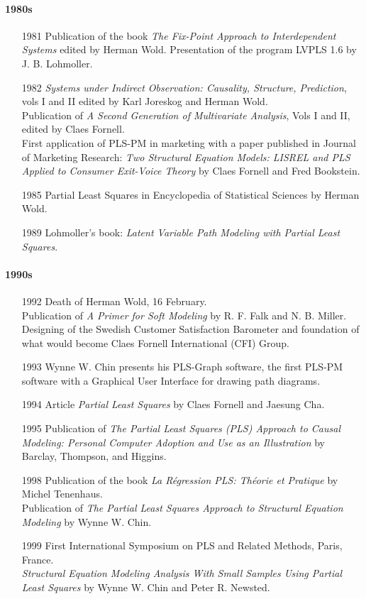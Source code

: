 \documentclass[12pt]{book}\usepackage{graphicx, color}
\begin{document}
\paragraph{1980s}
\begin{enumerate}
 \item[1981] Publication of the book \textit{The Fix-Point Approach to Interdependent Systems} edited by Herman Wold. Presentation of the program LVPLS 1.6 by J. B. Lohmoller.
 \item[1982] \textit{Systems under Indirect Observation: Causality, Structure, Prediction}, vols I and II edited by Karl Joreskog and Herman Wold. \\
Publication of \textit{A Second Generation of Multivariate Analysis}, Vols I and II, edited by Claes Fornell. \\
First application of PLS-PM in marketing with a paper published in Journal of Marketing Research: \textit{Two Structural Equation Models: LISREL and PLS Applied to Consumer Exit-Voice Theory} by Claes Fornell and Fred Bookstein.
 \item[1985] Partial Least Squares in Encyclopedia of Statistical Sciences by Herman Wold.
 \item[1989] Lohmoller's book: \textit{Latent Variable Path Modeling with Partial Least Squares}.
\end{enumerate}

\paragraph{1990s}
\begin{enumerate}
\item[1992] Death of Herman Wold, 16 February. \\
 Publication of \textit{A Primer for Soft Modeling} by R. F. Falk and N. B. Miller. \\
 Designing of the Swedish Customer Satisfaction Barometer and foundation of what would become Claes Fornell International (CFI) Group.
 \item[1993] Wynne W. Chin presents his PLS-Graph software, the first PLS-PM software with a Graphical User Interface for drawing path diagrams.
 \item[1994] Article \textit{Partial Least Squares} by Claes Fornell and Jaesung Cha.
 \item[1995] Publication of \textit{The Partial Least Squares (PLS) Approach to Causal Modeling: Personal Computer Adoption and Use as an Illustration} by Barclay, Thompson, and Higgins.
 \item[1998] Publication of the book \textit{La R\'{e}gression PLS: Th\'{e}orie et Pratique} by Michel Tenenhaus. \\
 Publication of \textit{The Partial Least Squares Approach to Structural Equation Modeling} by Wynne W. Chin.
 \item[1999] First International Symposium on PLS and Related Methods, Paris, France. \\
\textit{Structural Equation Modeling Analysis With Small Samples Using Partial Least Squares} by Wynne W. Chin and Peter R. Newsted.
\end{enumerate}
\end{document}
